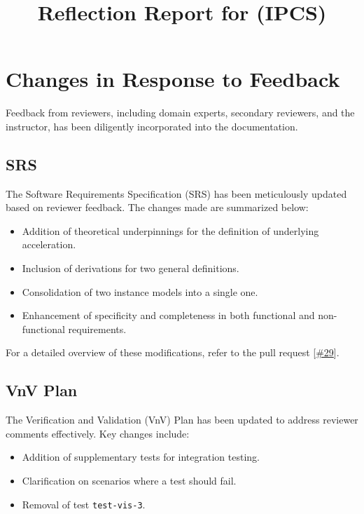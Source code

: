\documentclass{article}
\title{Reflection Report for \progname{} (IPCS)}
\author{\authname}
\date{}
\begin{document}
\maketitle

\section{Changes in Response to Feedback}

Feedback from reviewers, including domain experts, secondary reviewers, and the instructor, has been diligently incorporated into the documentation.

\subsection{SRS}

The Software Requirements Specification (SRS) has been meticulously updated based on reviewer feedback. The changes made are summarized below:

\begin{itemize}
    \item Addition of theoretical underpinnings for the definition of underlying acceleration.
    \item Inclusion of derivations for two general definitions.
    \item Consolidation of two instance models into a single one.
    \item Enhancement of specificity and completeness in both functional and non-functional requirements.
\end{itemize}

For a detailed overview of these modifications, refer to the pull request [\href{https://github.com/mirzaim/ipcs/pull/29}{\#29}].

\subsection{VnV Plan}

The Verification and Validation (VnV) Plan has been updated to address reviewer comments effectively. Key changes include:

\begin{itemize}
    \item Addition of supplementary tests for integration testing.
    \item Clarification on scenarios where a test should fail.
    \item Removal of test \texttt{test-vis-3}.
\end{itemize}
\end{document}
